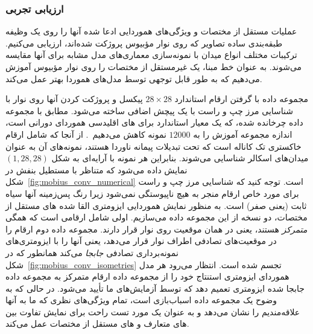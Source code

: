\subsubsection{ارزیابی تجربی}
\label{sec:mobius_evaluation}

عملیات مستقل از مختصات و ویژگی‌های هموردایی ادعا شده آنها را روی یک وظیفه طبقه‌بندی ساده تصاویر  که روی نوار مؤبیوس پروژکت شده‌اند، ارزیابی می‌کنیم.
ترکیبات مختلف انواع میدان با نمونه‌سازی معماری‌های مدل مشابه برای آنها مقایسه می‌شوند.
به عنوان خط مبنا، یک  غیرمستقل از مختصات را روی نوار مؤبیوس آموزش می‌دهیم که به طور قابل توجهی توسط مدل‌های هموردا بهتر عمل می‌کند.

مجموعه داده  با گرفتن ارقام استاندارد  $28\times28$ پیکسل و پروژکت کردن آنها روی نوار با شناسایی مرز چپ و راست با یک پیچش اضافی ساخته می‌شود.
مطابق با مجموعه داده  چرخانده شده، که یک معیار استاندارد برای های اقلیدسی هموردای دورانی است، اندازه مجموعه آموزش را به $12000$ نمونه کاهش می‌دهیم~\cite{Weiler2018SFCNN,Weiler2019_E2CNN}.
از آنجا که  شامل ارقام خاکستری تک کاناله است که تحت تبدیلات پیمانه ناوردا هستند، نمونه‌های آن به عنوان میدان‌های اسکالر شناسایی می‌شوند.
بنابراین هر نمونه با آرایه‌ای به شکل $(1,28,28)$ نمایش داده می‌شود که متناظر با مستطیل بنفش در شکل~\ref{fig:mobius_conv_numerical} است.
توجه کنید که شناسایی مرز چپ و راست برای مورد خاص ارقام  منجر به هیچ ناپیوستگی نمی‌شود زیرا رنگ پس‌زمینه آنها سیاه ثابت (یعنی صفر) است.
به منظور نمایش هموردایی ایزومتری القا شده های مستقل از مختصات، دو نسخه از این مجموعه داده می‌سازیم.
اولی شامل ارقامی است که همگی \emph{متمرکز} هستند، یعنی در همان موقعیت روی نوار قرار دارند.
مجموعه داده دوم ارقام را در موقعیت‌های تصادفی اطراف نوار قرار می‌دهد، یعنی آنها را با ایزومتری‌های نمونه‌برداری تصادفی \emph{جابجا} می‌کند همانطور که در شکل~\ref{fig:mobius_conv_isometries} تجسم شده است.
انتظار می‌رود هر مدل هموردای ایزومتری استنتاج خود را از مجموعه داده ارقام متمرکز به مجموعه داده جابجا شده ایزومتری تعمیم دهد که توسط آزمایش‌های ما تأیید می‌شود.
در حالی که  به وضوح یک مجموعه داده اسباب‌بازی است، تمام ویژگی‌های نظری که ما به آنها علاقه‌مندیم را نشان می‌دهد و به عنوان یک مورد تست راحت برای نمایش تفاوت بین های متعارف و های مستقل از مختصات عمل می‌کند.

